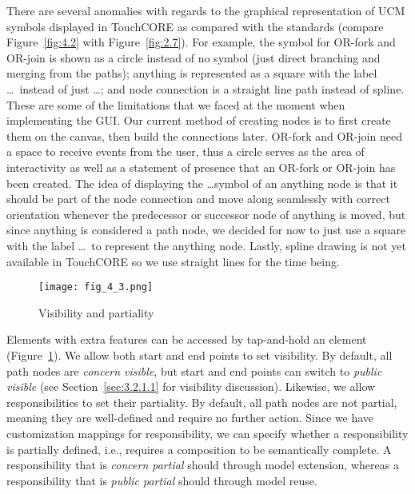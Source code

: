 There are several anomalies with regards to the graphical representation of UCM symbols displayed in TouchCORE as compared with the standards (compare Figure~\ref{fig:4.2} with Figure~\ref{fig:2.7}). For example, the symbol for OR-fork and OR-join is shown as a circle instead of no symbol (just direct branching and merging from the paths); anything is represented as a square with the label \ldots\ instead of just \ldots; and node connection is a straight line path instead of spline. These are some of the limitations that we faced at the moment when implementing the GUI. Our current method of creating nodes is to first create them on the canvas, then build the connections later. OR-fork and OR-join need a space to receive events from the user, thus a circle serves as the area of interactivity as well as a statement of presence that an OR-fork or OR-join has been created. The idea of displaying the \ldots symbol of an anything node is that it should be part of the node connection and move along seamlessly with correct orientation whenever the predecessor or successor node of anything is moved, but since anything is considered a path node, we decided for now to just use a square with the label \ldots\ to represent the anything node. Lastly, spline drawing is not yet available in TouchCORE so we use straight lines for the time being.

\begin{figure}
	\centering
	\texttt{[image: fig\_4\_3.png]}
	\caption{Visibility and partiality}
	\label{fig:4.3}
\end{figure}

Elements with extra features can be accessed by tap-and-hold an element (Figure~\ref{fig:4.3}). We allow both start and end points to set  visibility. By default, all path nodes are \emph{concern visible}, but start and end points can switch to \emph{public visible} (see Section~\ref{sec:3.2.1.1} for visibility discussion). Likewise, we allow responsibilities to set their partiality. By default, all path nodes are not partial, meaning they are well-defined and require no further action. Since we have customization mappings for responsibility, we can specify whether a responsibility is partially defined, i.e., requires a composition to be semantically complete. A responsibility that is \emph{concern partial} should  through model extension, whereas a responsibility that is \emph{public partial} should  through model reuse.

